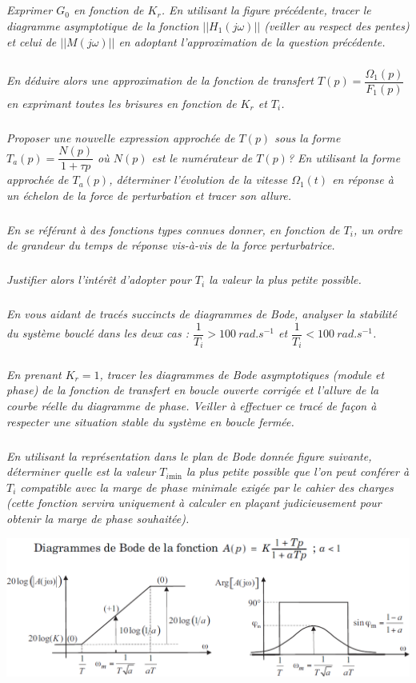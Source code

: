 \documentclass[10pt,fleqn]{article} %
\begin{document}
\begin{multicols}{2}
\subparagraph{}\textit{Exprimer $G_0$ en fonction de $K_r$. En utilisant la figure précédente, tracer le diagramme asymptotique de la fonction $\left|\left|H_1\left(j \omega\right)\right|\right|$ (veiller
au respect des pentes) et celui de $\left|\left|M\left(j \omega\right)\right|\right|$ en adoptant l’approximation de la
question précédente.}

\subparagraph{}\textit{En déduire alors une approximation de la fonction de transfert
$T(p)=\dfrac{\Omega_1(p)}{F_1(p)}$ en exprimant toutes les brisures en fonction de $K_r$ et $T_i$.}

\subparagraph{}\textit{Proposer une nouvelle expression approchée de $T(p)$ sous la forme $T_a(p)=\dfrac{N(p)}{1+\tau p}$ où $N(p)$ est le numérateur de $T(p)$? En utilisant la forme approchée de $T_a(p)$, déterminer l'évolution de la vitesse $\Omega_1(t)$ en réponse à un échelon de la force de perturbation et tracer son allure. }

\subparagraph{}\textit{En se référant à des fonctions types connues donner, en fonction de $T_i$, un ordre de grandeur du temps de réponse vis-à-vis de la force perturbatrice.}

\subparagraph{}\textit{Justifier alors l’intérêt d’adopter pour $T_i$ la valeur la plus petite possible.}

\subparagraph{}\textit{En vous aidant de tracés succincts de diagrammes
de Bode, analyser la stabilité du système
bouclé dans les deux cas : $\dfrac{1}{T_i}>\SI{100}{rad.s^{-1}}$ et $\dfrac{1}{T_i}<\SI{100}{rad.s^{-1}}$.}

\subparagraph{}\textit{En prenant $K_r=1$, tracer les diagrammes
de Bode asymptotiques (module et phase) de la fonction de transfert en boucle
ouverte corrigée et l’allure de la courbe réelle du diagramme de phase. Veiller à
effectuer ce tracé de façon à respecter une situation stable du système en boucle
fermée.}

\subparagraph{}\textit{En utilisant la représentation dans le plan de Bode donnée figure suivante, déterminer
quelle est la valeur $T_{i\text{min}}$ la plus petite possible que l’on peut conférer à $T_i$
compatible avec la marge de phase minimale exigée par le cahier des charges
(cette fonction servira uniquement à calculer en plaçant judicieusement
pour obtenir la marge de phase souhaitée).}


\begin{center}
\includegraphics[width=\linewidth]{images/fig_03}
\end{center}


\end{multicols}
\end{document}
